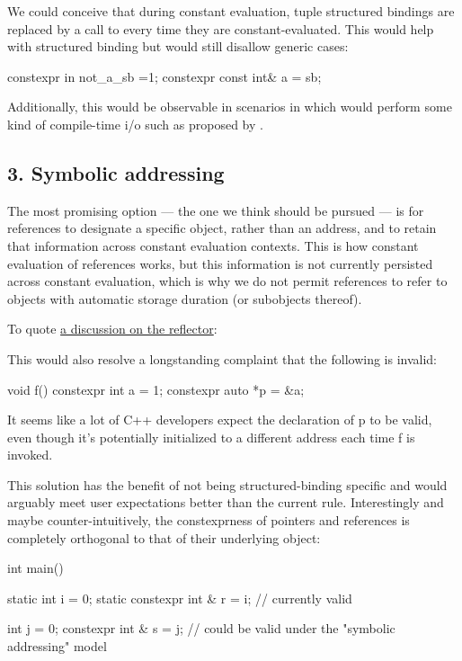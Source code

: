 \documentclass{wg21}
\begin{document}
We could conceive that during constant evaluation, tuple structured bindings are replaced by a call to  every time they are constant-evaluated.
This would help with  structured binding but would still disallow generic cases:

\begin{colorblock}
constexpr in not_a_sb =1;
constexpr const int&  a = sb;
\end{colorblock}

Additionally, this would be observable in scenarios in which  would perform some kind of compile-time i/o such as proposed by .

\subsection{3. Symbolic addressing}

The most promising option --- the one we think should be pursued --- is for  references to designate a specific object, rather than an address,
and to retain that information across constant evaluation contexts.
This is how constant evaluation of references works, but this information is not currently persisted across constant evaluation, which is why we do not permit
 references to refer to objects with automatic storage duration (or subobjects thereof).

To quote \href{https://lists.isocpp.org/core/2023/04/14163.php}{a discussion on the reflector}:

\begin{quoteblock}
This would also resolve a longstanding complaint that the following is invalid:
\begin{colorblock}
void f() {
    constexpr int a = 1;
    constexpr auto *p = &a;
}
\end{colorblock}

It seems like a lot of C++ developers expect the declaration of p to be valid, even though it's potentially initialized to a different address each time f is invoked.
\end{quoteblock}

This solution has the benefit of not being structured-binding specific and would arguably meet user expectations better than the current rule.
Interestingly and maybe counter-intuitively, the constexprness of pointers and references is completely orthogonal to that of their underlying object:

\begin{colorblock}
int main() {
    static int i = 0;
    static constexpr int & r = i; // currently valid

    int j = 0;
    constexpr int & s = j; // could be valid under the "symbolic addressing" model
}
\end{colorblock}
\end{document}
